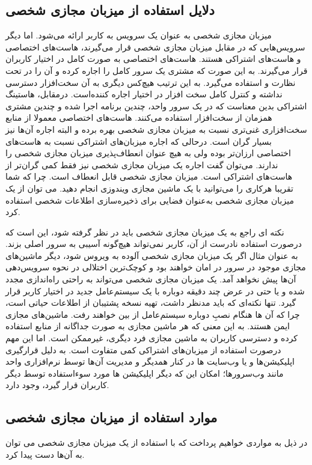{{\subsection{دلایل استفاده از میزبان مجازی شخصی}
میزبان مجازی شخصی به عنوان یک سرویس به کاربر ارائه می‌شود. اما دیگر سرویس‌هایی که در مقابل میزبان مجازی شخصی قرار می‌گیرند، هاست‌های اختصاصی و هاست‌های اشتراکی هستند.
هاست‌های اختصاصی به صورت کامل در اختیار کاربران قرار می‌گیرند. به این صورت که مشتری یک سرور کامل را اجاره کرده و آن را در تحت نظارت و استفاده می‌گیرد. به این ترتیب هیچ‌کس دیگری به آن سخت‌افزار دسترسی نداشته و کنترل کامل سخت افزار در اختیار اجاره کننده‌است.
درمقابل، هاستینگ اشتراکی بدین معناست که در یک سرور واحد، چندین برنامه اجرا شده و چندین مشتری همزمان از سخت‌افزار استفاده می‌کنند.
هاست‌های اختصاصی معمولا از منابع سخت‌افزاری غنی‌تری نسبت به میزبان مجازی شخصی بهره برده و البته اجاره آن‌ها نیز بسیار گران است. درحالی که اجاره میزبان‌های اشتراکی نسبت به هاست‌های اختصاصی ارزان‌تر بوده ولی به هیچ عنوان انعطاف‌پذیری میزبان مجازی شخصی را ندارند.
می‌توان گفت اجاره یک میزبان مجازی شخصی نیز فقط کمی گران‌تر از هاست‌های اشتراکی است. 
میزبان مجازی شخصی قابل انعطاف است. چرا که شما تقریبا هرکاری را می‌توانید با یک ماشین مجازی ویندوزی انجام دهید. می توان از یک میزبان مجازی شخصی به‌عنوان فضایی برای ذخیره‌سازی اطلاعات شخصی استفاده کرد.

نکته ای راجع به یک میزبان مجازی شخصی باید در نظر گرفته شود، این است که درصورت استفاده نادرست از آن، کاربر نمی‌تواند هیچ‌گونه آسیبی به سرور اصلی بزند. به عنوان مثال اگر یک میزبان مجازی شخصی آلوده به ویروس شود، دیگر ماشین‌های مجازی موجود در سرور در امان خواهند بود و کوچک‌ترین اختلالی در نحوه سرویس‌دهی آن‌ها پیش نخواهد آمد.
یک میزبان مجازی شخصی می‌تواند به راحتی راه‌اندازی مجدد شده و یا حتی در عرض چند دقیقه دوباره با یک سیستم‌عامل جدید در اختیار کاربر قرار گیرد. تنها نکته‌ای که باید مدنظر داشت، تهیه نسخه پشتیبان از اطلاعات حیاتی است، چرا که آن ها هنگام نصبِ دوباره سیستم‌عامل از بین خواهند رفت.
ماشین‌های مجازی ایمن هستند. به این معنی که هر ماشین مجازی به صورت جداگانه از منابع استفاده کرده و دسترسی کاربران به ماشین مجازی فرد دیگری، غیرممکن است.
اما این مهم درصورت استفاده از میزبان‌های اشتراکی کمی متفاوت است. به دلیل قرارگیری اپلیکیشن‌ها و یا وب‌سایت ها در کنار همدیگر و مدیریت آن‌ها توسط نرم‌افزاری واحد مانند وب‌سرورها؛ امکان این که دیگر اپلیکیشن ها مورد سوءاستفاده توسط دیگر کاربران قرار گیرد، وجود دارد.
 

\subsection{موارد استفاده از میزبان مجازی شخصی}
در ذیل به مواردی خواهیم پرداخت که با استفاده از یک میزبان مجازی شخصی می توان به آن‌ها دست پیدا کرد.

}}
